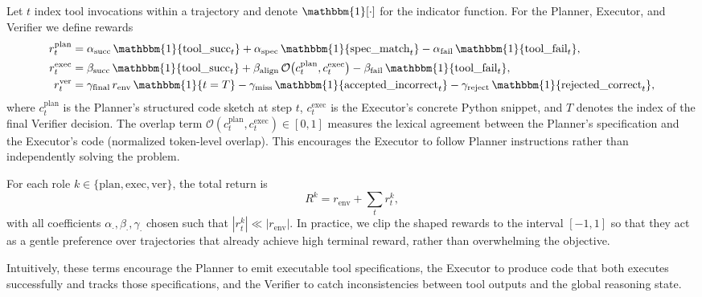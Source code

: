 \documentclass{article}
\begin{document}
Let $t$ index tool invocations within a trajectory and denote
$\mathbbm{1}[\cdot]$ for the indicator function. For the Planner, Executor, and
Verifier we define rewards
\begin{align}
  r^{\mathrm{plan}}_t
    &= \alpha_{\mathrm{succ}} \, \mathbbm{1}\{\text{tool\_succ}_t\}
     + \alpha_{\mathrm{spec}} \, \mathbbm{1}\{\text{spec\_match}_t\}
     - \alpha_{\mathrm{fail}} \, \mathbbm{1}\{\text{tool\_fail}_t\}, \\
  r^{\mathrm{exec}}_t
    &= \beta_{\mathrm{succ}} \, \mathbbm{1}\{\text{tool\_succ}_t\}
     + \beta_{\mathrm{align}} \, \mathcal{O}\bigl(c_t^{\mathrm{plan}}, c_t^{\mathrm{exec}}\bigr)
     - \beta_{\mathrm{fail}} \, \mathbbm{1}\{\text{tool\_fail}_t\}, \\
  r^{\mathrm{ver}}_t
    &= \gamma_{\mathrm{final}} \, r_{\mathrm{env}} \, \mathbbm{1}\{t = T\}
     - \gamma_{\mathrm{miss}} \, \mathbbm{1}\{\text{accepted\_incorrect}_t\}
     - \gamma_{\mathrm{reject}} \, \mathbbm{1}\{\text{rejected\_correct}_t\},
\end{align}
where $c_t^{\mathrm{plan}}$ is the Planner's structured code sketch at step $t$,
$c_t^{\mathrm{exec}}$ is the Executor's concrete Python snippet, and
$T$ denotes the index of the final Verifier decision. The overlap term
$\mathcal{O}(c_t^{\mathrm{plan}}, c_t^{\mathrm{exec}}) \in [0,1]$ measures the
lexical agreement between the Planner's specification and the Executor's code
(normalized token-level overlap). This encourages the Executor to follow
Planner instructions rather than independently solving the problem.

For each role $k \in \{\mathrm{plan},\mathrm{exec},\mathrm{ver}\}$, the total return is
\begin{equation}
  R^{k} = r_{\mathrm{env}} + \sum_{t} r^{k}_t,
\end{equation}
with all coefficients $\alpha_\cdot, \beta_\cdot, \gamma_\cdot$ chosen such that
$|r^{k}_t| \ll |r_{\mathrm{env}}|$. In practice, we clip the shaped rewards to the
interval $[-1,1]$ so that they act as a gentle preference over trajectories that
already achieve high terminal reward, rather than overwhelming the objective.

Intuitively, these terms encourage the Planner to emit executable tool
specifications, the Executor to produce code that both executes successfully and
tracks those specifications, and the Verifier to catch inconsistencies between
tool outputs and the global reasoning state. 
\end{document}
